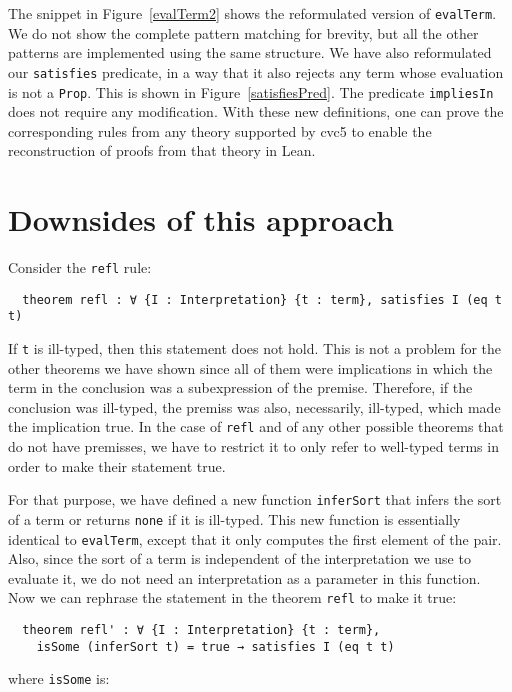 The snippet in Figure~\ref{evalTerm2} shows the reformulated version of \texttt{evalTerm}.
We do not show the complete pattern matching for brevity, but all the other
patterns are implemented using the same structure.
We have also reformulated our \texttt{satisfies} predicate, in a way that
it also rejects any term whose evaluation is not a \texttt{Prop}. This is shown
in Figure~\ref{satisfiesPred}. The predicate \texttt{impliesIn} does not require
any modification. With these new definitions, one can prove the corresponding
rules from any theory supported by cvc5 to enable the reconstruction of
proofs from that theory in Lean.

\newpage

\section{Downsides of this approach}\label{sec:downsides}

Consider the \texttt{refl} rule:

\begin{verbatim}
  theorem refl : ∀ {I : Interpretation} {t : term}, satisfies I (eq t t)
\end{verbatim}

If \texttt{t} is ill-typed, then this statement does not hold. This is not
a problem for the other theorems we have shown since all of them were implications in
which the term in the conclusion was a subexpression of the premise. Therefore,
if the conclusion was ill-typed, the premiss was also, necessarily, ill-typed,
which made the implication true. In the case of \texttt{refl} and of
any other possible theorems that do not have premisses, we have to restrict it
to only refer to well-typed terms in order to make their statement true.

For that purpose, we have defined a new function \texttt{inferSort} that infers the sort of a term
or returns \texttt{none} if it is ill-typed.
This new function is essentially identical to
\texttt{evalTerm}, except that it only computes the first element of the pair.
Also, since the sort of a term is independent of the interpretation we use
to evaluate it, we do not need an interpretation as a parameter in this function.
Now we can rephrase the statement in the theorem \texttt{refl} to make it true:

\begin{verbatim}
  theorem refl' : ∀ {I : Interpretation} {t : term},
    isSome (inferSort t) = true → satisfies I (eq t t)
\end{verbatim}
where \texttt{isSome} is:

